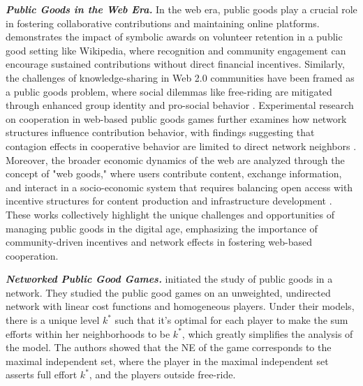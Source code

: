 \emph{\bf Public Goods in the Web Era.}
In the web era, public goods play a crucial role in fostering collaborative contributions and maintaining online platforms. 
\citet{public_good-web-1:gallus2017fostering} demonstrates the impact of symbolic awards on volunteer retention in a public good setting like Wikipedia, where recognition and community engagement can encourage sustained contributions without direct financial incentives. 
Similarly, the challenges of knowledge-sharing in Web 2.0 communities have been framed as a public goods problem, where social dilemmas like free-riding are mitigated through enhanced group identity and pro-social behavior \citep{public_good-web-2:allen2010knowledge}.
Experimental research on cooperation in web-based public goods games further examines how network structures influence contribution behavior, with findings suggesting that contagion effects in cooperative behavior are limited to direct network neighbors \citep{public_good-web-3:suri2011cooperation}.
Moreover, the broader economic dynamics of the web are analyzed through the concept of "web goods," where users contribute content, exchange information, and interact in a socio-economic system that requires balancing open access with incentive structures for content production and infrastructure development \citep{public_good-web-4:vafopoulos2012web}.
These works collectively highlight the unique challenges and opportunities of managing public goods in the digital age, emphasizing the importance of community-driven incentives and network effects in fostering web-based cooperation.

\emph{\bf Networked Public Good Games.}
\citet{public-network:bramoulle2007public} initiated the study of public goods in a network. They studied the public good games on an unweighted, undirected network with linear cost functions and homogeneous players. Under their models, there is a unique level $k^*$ such that it's optimal for each player to make the sum efforts within her neighborhoods to be $k^*$, which greatly simplifies the analysis of the model. The authors showed that the NE of the game corresponds to the maximal independent set, where the player in the maximal independent set asserts full effort $k^*$, and the players outside free-ride. 

